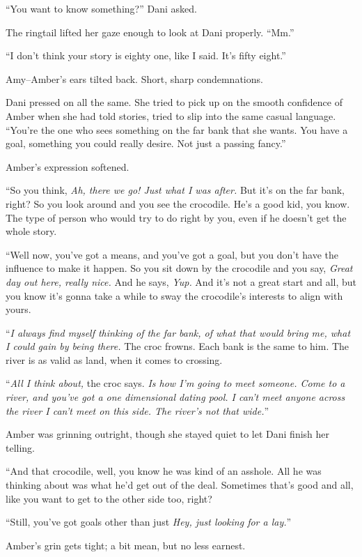 ``You want to know something?'' Dani asked.

The ringtail lifted her gaze enough to look at Dani properly. ``Mm.''

``I don't think your story is eighty one, like I said. It's fifty eight.''

Amy--Amber's ears tilted back. Short, sharp condemnations.

Dani pressed on all the same. She tried to pick up on the smooth confidence of Amber when she had told stories, tried to slip into the same casual language. ``You're the one who sees something on the far bank that she wants. You have a goal, something you could really desire. Not just a passing fancy.''

Amber's expression softened.

``So you think, \emph{Ah, there we go! Just what I was after.} But it's on the far bank, right? So you look around and you see the crocodile. He's a good kid, you know. The type of person who would try to do right by you, even if he doesn't get the whole story.

``Well now, you've got a means, and you've got a goal, but you don't have the influence to make it happen. So you sit down by the crocodile and you say, \emph{Great day out here, really nice.} And he says, \emph{Yup.} And it's not a great start and all, but you know it's gonna take a while to sway the crocodile's interests to align with yours.

``\emph{I always find myself thinking of the far bank, of what that would bring me, what I could gain by being there.} The croc frowns. Each bank is the same to him. The river is as valid as land, when it comes to crossing.

``\emph{All I think about,} the croc says. \emph{Is how I'm going to meet someone. Come to a river, and you've got a one dimensional dating pool. I can't meet anyone across the river I can't meet on this side. The river's not that wide.}''

Amber was grinning outright, though she stayed quiet to let Dani finish her telling.

``And that crocodile, well, you know he was kind of an asshole. All he was thinking about was what he'd get out of the deal. Sometimes that's good and all, like you want to get to the other side too, right?

``Still, you've got goals other than just \emph{Hey, just looking for a lay.}''

Amber's grin gets tight; a bit mean, but no less earnest.

